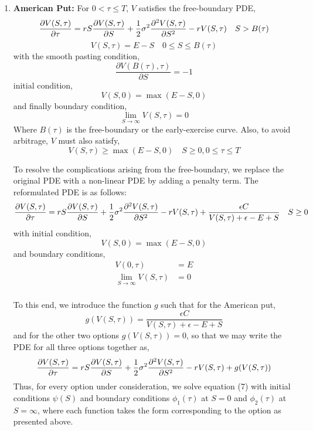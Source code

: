 \documentclass[a4paper,12pt]{article}
\begin{document}
\begin{enumerate}
    \item \textbf{American Put:} For $0 < \tau \leq T$, $V$ satisfies the free-boundary PDE,
    \begin{equation}
        \frac{\partial V(S, \tau)}{\partial \tau} = rS\frac{\partial V(S, \tau)}{\partial S} + \frac{1}{2}\sigma^2\frac{\partial^2 V(S, \tau)}{\partial S^2} - rV(S, \tau) \quad S > B(\tau)
    \end{equation}
    \begin{equation*}
        V(S, \tau) = E - S \quad 0 \leq S \leq B(\tau)
    \end{equation*}
    with the smooth pasting condition,
    \begin{equation*}
        \frac{\partial V(B(\tau), \tau)}{\partial S} = -1 
    \end{equation*}
    initial condition,
    \begin{equation*}
        V(S, 0) = \max(E-S, 0)
    \end{equation*}
    and finally boundary condition,
    \begin{equation*}
        \lim_{S \to \infty} V(S, \tau) = 0
    \end{equation*}
    Where $B(\tau)$ is the free-boundary or the early-exercise curve. Also, to avoid arbitrage, $V$ must also satisfy,
    \begin{equation*}
        V(S, \tau) \geq \max(E - S,0) \quad S \geq 0, 0 \leq \tau \leq T
    \end{equation*}
    
    To resolve the complications arising from the free-boundary, we replace the original PDE with a non-linear PDE by adding a penalty term. The reformulated PDE is as follows:
    \begin{equation}
        \frac{\partial V(S, \tau)}{\partial \tau} = rS\frac{\partial V(S, \tau)}{\partial S} + \frac{1}{2}\sigma^2\frac{\partial^2 V(S, \tau)}{\partial S^2} - rV(S, \tau) + \frac{\epsilon C}{V(S, \tau) + \epsilon - E + S} \quad S\geq0
    \end{equation}
    with initial condition,
    \begin{equation*}
        V(S, 0) = \max(E-S,0)
    \end{equation*}
    and boundary conditions,
    \begin{equation*}
        \begin{split}
            V(0,\tau) &= E\\
            \lim_{S \to \infty}V(S, \tau) &= 0\\
        \end{split}
    \end{equation*}
    
    To this end, we introduce the function $g$ such that for the American put,
    \begin{equation}
        g(V(S,\tau)) = \frac{\epsilon C}{V(S, \tau) + \epsilon - E + S}
    \end{equation}
    and for the other two options $g(V(S,\tau)) = 0$, so that we may write the PDE for all three options together as,
    \begin{equation}
        \frac{\partial V(S, \tau)}{\partial \tau} = rS\frac{\partial V(S, \tau)}{\partial S} + \frac{1}{2}\sigma^2\frac{\partial^2 V(S, \tau)}{\partial S^2} - rV(S, \tau) + g(V(S, \tau))
    \end{equation}
    Thus, for every option under consideration, we solve equation (7) with initial conditions $\psi(S)$ and boundary conditions $\phi_1(\tau)$ at $S = 0$ and $\phi_2(\tau)$ at $S = \infty$, where each function takes the form corresponding to the option as presented above.
\end{enumerate}
\end{document}
